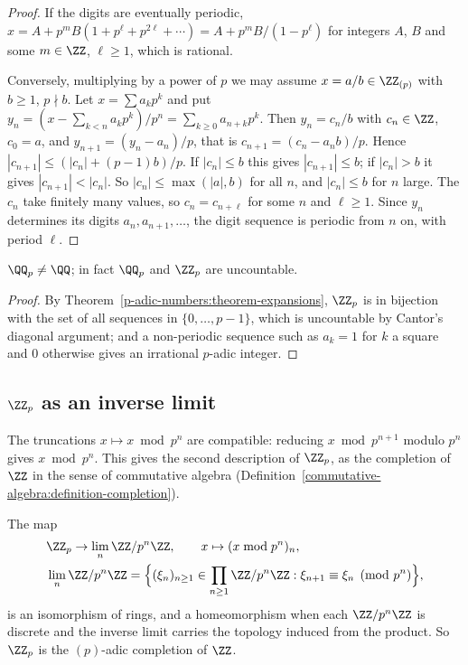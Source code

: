 \begin{proof}
If the digits are eventually periodic, $x = A + p^mB(1 + p^\ell + p^{2\ell} + \cdots) = A + p^mB/(1 - p^\ell)$ for integers $A$, $B$ and some $m \in \ZZ$, $\ell \geq 1$, which is rational.

Conversely, multiplying by a power of $p$ we may assume $x = a/b \in \ZZ_{(p)}$ with $b \geq 1$, $p \nmid b$. Let $x = \sum a_kp^k$ and put $y_n = (x - \sum_{k < n}a_kp^k)/p^n = \sum_{k \geq 0}a_{n+k}p^k$. Then
$y_n = c_n/b$ with $c_n \in \ZZ$, $c_0 = a$, and $y_{n+1} = (y_n - a_n)/p$, that is $c_{n+1} = (c_n - a_nb)/p$. Hence $|c_{n+1}| \leq (|c_n| + (p - 1)b)/p$. If $|c_n| \leq b$ this gives
$|c_{n+1}| \leq b$; if $|c_n| > b$ it gives $|c_{n+1}| < |c_n|$. So $|c_n| \leq \max(|a|, b)$ for all $n$, and $|c_n| \leq b$ for $n$ large. The $c_n$ take finitely many values, so $c_n = c_{n+\ell}$ for some
$n$ and $\ell \geq 1$. Since $y_n$ determines its digits $a_n, a_{n+1}, \ldots$, the digit sequence is periodic from $n$ on, with period $\ell$.
\end{proof}

\begin{corollary}\label{p-adic-numbers:corollary-q-p-uncountable}
$\QQ_p \neq \QQ$; in fact $\QQ_p$ and $\ZZ_p$ are uncountable.
\end{corollary}

\begin{proof}
By Theorem~\ref{p-adic-numbers:theorem-expansions}, $\ZZ_p$ is in bijection with the set of all sequences in $\{0, \ldots, p - 1\}$, which is uncountable by Cantor's diagonal argument; and a non-periodic
sequence such as $a_k = 1$ for $k$ a square and $0$ otherwise gives an irrational $p$-adic integer.
\end{proof}

\subsection{$\ZZ_p$ as an inverse limit}\label{p-adic-numbers:subsection-inverse-limit}

The truncations $x \mapsto x \bmod p^n$ are compatible: reducing $x \bmod p^{n+1}$ modulo $p^n$ gives $x \bmod p^n$. This gives the second description of $\ZZ_p$, as the completion of $\ZZ$ in the sense
of commutative algebra (Definition~\ref{commutative-algebra:definition-completion}).

\begin{theorem}\label{p-adic-numbers:theorem-inverse-limit}
The map
\[
\begin{aligned}
&\ZZ_p \to \lim_n\ZZ/p^n\ZZ, \qquad x \mapsto (x \bmod p^n)_n, \\
&\lim_n\ZZ/p^n\ZZ = \Bigl\{(\xi_n)_{n \geq 1} \in \prod_{n \geq 1}\ZZ/p^n\ZZ : \xi_{n+1} \equiv \xi_n \pmod{p^n}\Bigr\},
\end{aligned}
\]
is an isomorphism of rings, and a homeomorphism when each $\ZZ/p^n\ZZ$ is discrete and the inverse limit carries the topology induced from the product. So $\ZZ_p$ is the $(p)$-adic completion of $\ZZ$.
\end{theorem}

